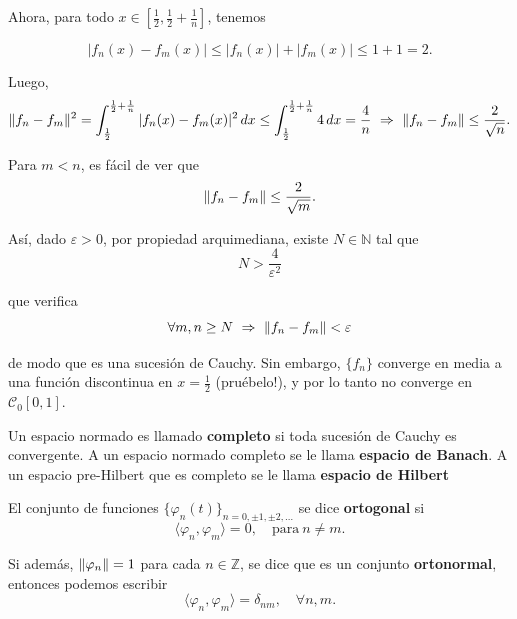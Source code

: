 \begin{ejemplo}
Ahora, para todo $x \in \left[\frac{1}{2}, \frac{1}{2}  + \frac{1}{n} \right]$, tenemos

$$|f_n(x) - f_m(x)| \leq |f_n(x)| + |f_m(x)| \leq 1 + 1 = 2. $$

Luego, 
\begin{equation*}
   \lVert f_n - f_m\rVert^2  = \int_{\frac{1}{2}}^{\frac{1}{2} + \frac{1}{n}} |f_n(x) - f_m(x)|^2 \,dx \leq \int_{\frac{1}{2}}^{\frac{1}{2} + \frac{1}{n}} 4 \,dx = \frac{4}{n} ~\Rightarrow~ \lVert f_n - f_m\rVert \leq \frac{2}{\sqrt{n}}.
\end{equation*}

Para $m < n$, es fácil de ver que 
$$\lVert f_n - f_m\rVert \leq \frac{2}{\sqrt{m}}.$$

Así, dado $\varepsilon > 0$, por propiedad arquimediana, existe $N \in \mathbb{N}$ tal que 
$$N > \frac{4}{\varepsilon^2} $$

que verifica 
$$\forall m,n \geq N ~\Rightarrow~   \lVert f_n - f_m\rVert < \varepsilon$$

de modo que es una sucesión de Cauchy. Sin embargo, $\{f_n\}$ converge en media a una función discontinua en $x = \frac{1}{2}$ (pruébelo!), y por lo tanto no converge en $\mathcal{C}_0[0,1]$.
\end{ejemplo}

\begin{defi}
Un espacio normado es llamado \textbf{completo} si toda sucesión de Cauchy es convergente. A un espacio normado completo se le llama \textbf{espacio de Banach}. A un espacio pre-Hilbert que es completo se le llama \textbf{espacio de Hilbert}
\end{defi}

\begin{defi}
El conjunto de funciones $\{\varphi_n(t)\}_{n=0, \pm 1, \pm 2, \dots}$ se dice \textbf{ortogonal} si 
$$\langle \varphi_n , \varphi_m \rangle = 0, \quad \mbox{para} ~ n \neq m.$$

Si además, $\lVert\varphi_n\rVert = 1$ para cada $n \in \mathbb{Z}$, se dice que es un conjunto \textbf{ortonormal}, entonces podemos escribir 
$$\langle \varphi_n , \varphi_m \rangle = \delta_{nm}, \quad \forall n,m.$$
\end{defi}

